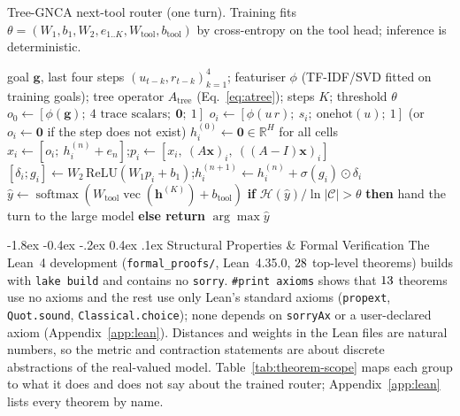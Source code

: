 \documentclass[10pt,twocolumn,letterpaper]{article}
\makeatletter
\renewcommand\section{\@startsection {section}{1}{\z@}%
  {-1.8ex \@plus -0.4ex \@minus -.2ex}%
  {0.4ex \@plus.1ex}%
  {\normalfont\normalsize\bfseries}}
\makeatother
\begin{document}
\begin{algorithm}[t]
\caption{Tree-GNCA next-tool router (one turn). Training fits $\theta=(W_1,b_1,W_2,e_{1..K},W_{\text{tool}},b_{\text{tool}})$ by cross-entropy on the tool head; inference is deterministic.}
\label{alg:router}
\small
\begin{algorithmic}[1]
\Require goal $\mathbf g$, last four steps $(u_{t-k},r_{t-k})_{k=1}^{4}$; featuriser $\phi$ (TF-IDF/SVD fitted on training goals); tree operator $A_{\text{tree}}$ (Eq.~\eqref{eq:atree}); steps $K$; threshold $\theta$
\State $o_0 \gets [\phi(\mathbf g);\ \text{4 trace scalars};\ \mathbf 0;\ 1]$ 
 
  \State $o_i \gets [\phi(u\,r);\ s_i;\ \mathrm{onehot}(u);\ 1]$ 
  \State \hspace{1em}(or $o_i \gets \mathbf 0$ if the step does not exist)
\EndFor
\State $h_i^{(0)} \gets \mathbf 0 \in\mathbb R^{H}$ for all cells
 
  \State $x_i \gets [o_i;\ h_i^{(n)}+e_n]$;\quad $p_i \gets [x_i,\ (A\mathbf x)_i,\ ((A-I)\mathbf x)_i]$
  \State $[\delta_i; g_i] \gets W_2\,\mathrm{ReLU}(W_1 p_i + b_1)$;\quad $h_i^{(n+1)} \gets h_i^{(n)} + \sigma(g_i)\odot\delta_i$
\EndFor
\State $\hat y \gets \operatorname{softmax}(W_{\text{tool}}\operatorname{vec}(\mathbf h^{(K)}) + b_{\text{tool}})$
\State \textbf{if} $\mathcal H(\hat y)/\ln|\mathcal C| > \theta$ \textbf{then} hand the turn to the large model \textbf{else return} $\arg\max \hat y$ 
\end{algorithmic}
\end{algorithm}

\section{Structural Properties \& Formal Verification}\label{sec:formal}
The Lean~4 development (\texttt{formal\_\allowbreak{}proofs/}, Lean~4.35.0, $28$ top-level theorems) builds with \texttt{lake build} and contains no \texttt{sorry}. \texttt{\#print axioms} shows that $13$ theorems use no axioms and the rest use only Lean's standard axioms (\texttt{propext}, \texttt{Quot.sound}, \texttt{Classical.choice}); none depends on \texttt{sorryAx} or a user-declared axiom (Appendix~\ref{app:lean}). Distances and weights in the Lean files are natural numbers, so the metric and contraction statements are about discrete abstractions of the real-valued model. Table~\ref{tab:theorem-scope} maps each group to what it does and does not say about the trained router; Appendix~\ref{app:lean} lists every theorem by name.
\end{document}
